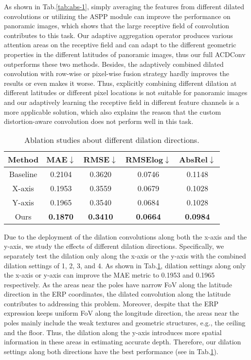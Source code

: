 \documentclass[letterpaper]{article} \usepackage{aaai21}  \usepackage{times}  \usepackage{helvet} \usepackage{courier}  \usepackage[hyphens]{url}  \usepackage{graphicx} \urlstyle{rm} \def\UrlFont{\rm}  \usepackage{natbib}  \usepackage{caption} \frenchspacing  \setlength{\pdfpagewidth}{8.5in}  \setlength{\pdfpageheight}{11in}
\newcommand{\newchange}[1]{{\color{black}#1}}
\begin{document}
As shown in Tab.\ref{tab:abs-1}, simply averaging the features from different dilated convolutions or utilizing the ASPP module can improve the performance on panoramic images, which shows that the large receptive field of convolution contributes to this task. 
Our adaptive aggregation operator produces various attention areas on the receptive field and can adapt to the different geometric properties in the different latitudes of panoramic images, thus our full ACDConv outperforms these two methods.
\newchange{
Besides, the adaptively combined dilated convolution with row-wise or pixel-wise fusion strategy hardly improves the results or even makes it worse. 
Thus, explicitly combining different dilation at different latitudes or different pixel locations is not suitable for panoramic images and our adaptively learning the receptive field in different feature channels is a more applicable solution, which also explains the reason that the custom distortion-aware convolution does not perform well in this task.
}

\begin{table}[tb]
    \centering
\begin{tabular}{ccccc} 
\toprule 
Method & MAE$\downarrow$ & RMSE$\downarrow$ & RMSElog$\downarrow$ &  AbsRel$\downarrow$ \\
\midrule 
Baseline  & 0.2104 & 0.3620 & 0.0746 & 0.1148 \\
X-axis & 0.1953 & 0.3559 & 0.0679 & 0.1028 \\
Y-axis & 0.1965 & 0.3540 & 0.0684 & 0.1028 \\
Ours   & \textbf{0.1870} & \textbf{0.3410} & \textbf{0.0664} & \textbf{0.0984} \\
\bottomrule
    \end{tabular}
    \caption{Ablation studies about different dilation directions.}
    \label{tab:abs-2}
\end{table}

Due to the deployment of the dilation convolutions along both the x-axis and the y-axis, we study the effects of different dilation directions. 
Specifically, we separately test the dilation only along the x-axis or the y-axis with the combined dilation settings of 1, 2, 3, and 4. 
As shown in Tab.\ref{tab:abs-2}, dilation settings along only the x-axis or y-axis can improve the MAE metric to 0.1953 and 0.1965 respectively. 
As the areas near the poles have narrow FoV along the latitude direction in the ERP coordinates, the dilated convolution along the latitude contributes to addressing this problem. 
Moreover, despite that the ERP expression keeps uniform FoV along the longitude direction, the areas near the poles mainly include the weak textures and geometric structures, e.g., the ceiling and the floor. Thus, the dilation along the y-axis introduces more spatial information in these areas in estimating accurate depth. 
Therefore, our dilation settings along both directions have the best performance (see in Tab.\ref{tab:abs-2}).
\end{document}
